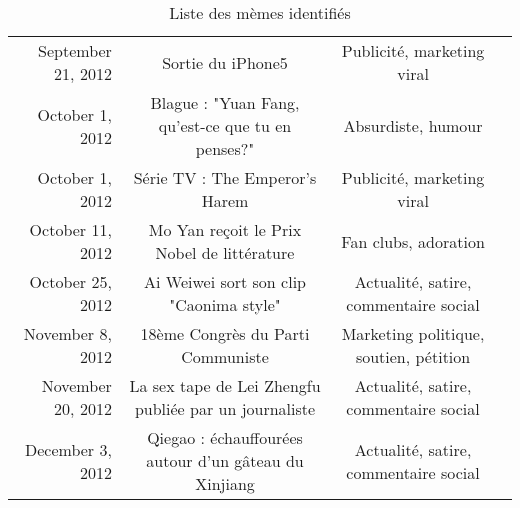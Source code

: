 \begin{table}[ht!]
\begin{minipage}{22cm}
\begin{turn}{90}
\begin{tabulary}{\linewidth}{ r| C C C}
        September 21, 2012 & 
        Sortie du iPhone5   &
        Publicité, marketing viral & 
         \\

        October 1, 2012 & 
        Blague : "Yuan Fang, qu'est-ce que tu en penses?"  & 
        Absurdiste, humour & 
         \\

        October 1, 2012 &
        Série TV : The Emperor's Harem & 
        Publicité, marketing viral &
         \\

        October 11, 2012  &
        Mo Yan reçoit le Prix Nobel de littérature &
        Fan clubs, adoration  &
         \\

        October 25, 2012 &
        Ai Weiwei sort son clip "Caonima style"&
        Actualité, satire, commentaire social &
        \\

        November 8, 2012 &
        18ème Congrès du Parti Communiste &
        Marketing politique, soutien, pétition &
        \\

        November 20, 2012 &
        La sex tape de Lei Zhengfu publiée par un journaliste &
        Actualité, satire, commentaire social &
        \\

        December 3, 2012  &
        Qiegao : échauffourées autour d'un gâteau du Xinjiang &
        Actualité, satire, commentaire social &
        \\
    \end{tabulary}
        \end{turn}
    \end{minipage}
    \caption[Liste des mèmes identifiés]{Liste des mèmes identifiés}
    \label{fig:memelist}
\end{table}

